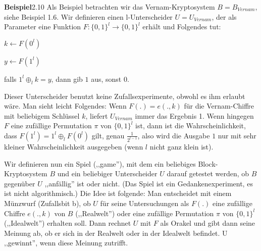 \documentclass[a4paper]{article}
\begin{document}
\begin{multicols}{3}
    \textbf{Beispiel}2.10 Als Beispiel betrachten wir das Vernam-Kryptosystem $B=B_{Vernam}$, siehe Beispiel 1.6. Wir definieren einen l-Unterscheider $U=U_{Vernam}$, der als Parameter eine Funktion $F:\{0,1\}^l\rightarrow\{0,1\}^l$ erhält und Folgendes tut:
    \begin{enumerate*}
        \item $k\leftarrow F(0^l)$
        \item $y\leftarrow F(1^l)$
        \item falls $1^l\oplus_l k=y$, dann gib $1$ aus, sonst $0$.
    \end{enumerate*}

    Dieser Unterscheider benutzt keine Zufallsexperimente, obwohl es ihm erlaubt wäre. Man sieht leicht Folgendes: Wenn $F(.) =e(.,k)$ für die Vernam-Chiffre mit beliebigem Schlüssel $k$, liefert $U_{Vernam}$ immer das Ergebnis 1. Wenn hingegen $F$ eine zufällige Permutation $\pi$ von $\{0,1\}^l$ ist, dann ist die Wahrscheinlichkeit, dass $F(1^l)=1^l\oplus_l F(0^l)$ gilt, genau $\frac{1}{2^{l-1}}$, also wird die Ausgabe $1$ nur mit sehr kleiner Wahrscheinlichkeit ausgegeben (wenn $l$ nicht ganz klein ist).

    Wir definieren nun ein Spiel (,,game''), mit dem ein beliebiges Block-Kryptosystem $B$ und ein beliebiger Unterscheider $U$ darauf getestet werden, ob $B$ gegenüber $U$ ,,anfällig'' ist oder nicht. (Das Spiel ist ein Gedankenexperiment, es ist nicht algorithmisch.) Die Idee ist folgende: Man entscheidet mit einem Münzwurf (Zufallsbit b), ob $U$ für seine Untersuchungen als $F(.)$ eine zufällige Chiffre $e(.,k)$ von $B$ (,,Realwelt'') oder eine zufällige Permutation $\pi$ von $\{0,1\}^l$ (,,Idealwelt'') erhalten soll. Dann rechnet $U$ mit $F$ als Orakel und gibt dann seine Meinung ab, ob er sich in der Realwelt oder in der Idealwelt befindet. U ,,gewinnt'', wenn diese Meinung zutrifft.


\end{multicols}
\end{document}
